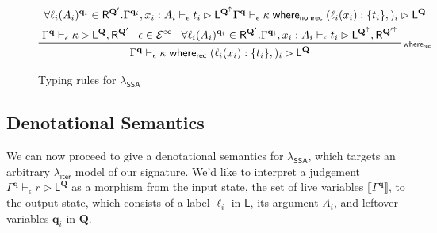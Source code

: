 \documentclass[acmsmall,screen,review]{acmart}
\newcommand{\mc}[1]{\ensuremath{\mathcal{#1}}}
\newcommand{\mb}[1]{\ensuremath{\mathbf{#1}}}
\newcommand{\ms}[1]{\ensuremath{\mathsf{#1}}}
\newcommand{\lto}{:}
\newcommand{\awhere}[2]{#1\;\ms{where}_{\ms{nonrec}}\;#2}
\newcommand{\cwhere}[2]{#1\;\ms{where}_{\ms{rec}}\;#2}
\newcommand{\wbranch}[3]{#1(#2) \lto \{#3\}}
\newcommand{\einf}[1]{#1 \in \mc{E}^\infty}
\newcommand{\lhyp}[2]{#1(#2)}
\newcommand{\rle}[1]{{\scriptsize\textsf{#1}}}
\newcommand{\haslb}[4]{#1 \vdash_{#2} #3 \rhd #4}
\newcommand{\dnt}[1]{\llbracket{#1}\rrbracket}
\newcommand{\subiterexp}{\texorpdfstring{\(\lambda_{\ms{iter}}\)}{lambda-iter}}
\newcommand{\isotopessa}{\(\lambda_{\ms{SSA}}\)}
\newcommand{\zeroqv}[1]{#1^\uparrow}
\begin{document}
\begin{figure}
\begin{gather*}
      {\forall \lhyp{\ell_i}{A_i}^{\mb{q}_i} \in \ms{R}^{\mb{Q}'} .
        \haslb{\Gamma^{\mb{q}_i}, x_i : A_i}{\epsilon}{t_i}{\ms{L}^{\zeroqv{\mb{Q}}}}
      }
      {\haslb{\Gamma^{\mb{q}}}{\epsilon}{\awhere{\kappa}{(\wbranch{\ell_i}{x_i}{t_i},)_i}}
        {\ms{L}^{\mb{Q}}}}
    \\
    \prftree[r]{\rle{where$_{\ms{rec}}$}}
    {\haslb{\Gamma^{\mb{q}}}{\epsilon}{\kappa}
      {\ms{L}^{\mb{Q}}, \ms{R}^{\mb{Q}'}}}
    {\einf{\epsilon}}
    {\forall \lhyp{\ell_i}{A_i}^{\mb{q}_i} \in \ms{R}^{\mb{Q}'} .
      \haslb{\Gamma^{\mb{q}_i}, x_i : A_i}{\epsilon}{t_i}{
        \ms{L}^{\zeroqv{\mb{Q}}}, \ms{R}^{\zeroqv{\mb{Q}'}}}
    }
    {\haslb{\Gamma^{\mb{q}}}{\epsilon}{\cwhere{\kappa}{(\wbranch{\ell_i}{x_i}{t_i},)_i}}
      {\ms{L}^{\mb{Q}}}}
  \end{gather*}
  \caption{Typing rules for \isotopessa{}}
  \Description{}
  \label{fig:ssa-typing}
\end{figure}

\subsection{Denotational Semantics}

We can now proceed to give a denotational semantics for \isotopessa{}, which targets an arbitrary
\subiterexp{} model of our signature. We'd like to interpret a judgement
$\haslb{\Gamma^{\mb{q}}}{\epsilon}{r}{\ms{L}^{\mb{Q}}}$ as a morphism from the input state, the set
of live variables $\dnt{\Gamma^{\mb{q}}}$, to the output state, which consists of a label $\ell_i$
in $\ms{L}$, its argument $A_i$, and leftover variables $\mb{q}_i$ in $\mb{Q}$. 
\end{document}

